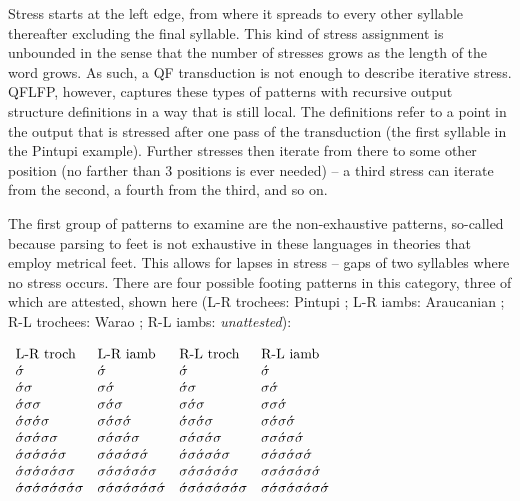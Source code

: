 \documentclass[12pt]{article}
\newcommand{\sig}{\sigma}
\newcommand{\ass}{\acute{\sig}}
\newcommand{\tm}{\textnormal}
\newcommand{\tr}{\ass\sig}
\newcommand{\im}{\sig\ass}
\begin{document}
\noindent 	
Stress starts at the left edge, from where it spreads to every other syllable thereafter excluding the final syllable. This kind of stress assignment is unbounded in the sense that the number of stresses grows as the length of the word grows. As such, a QF transduction is not enough to describe iterative stress. QFLFP, however, captures these types of patterns with recursive output structure definitions in a way that is still local. The definitions refer to a point in the output that is stressed after one pass of the transduction (the first syllable in the Pintupi example). Further stresses then iterate from there to some other position (no farther than 3 positions is ever needed) -- a third stress can iterate from the second, a fourth from the third, and so on.

The first group of patterns to examine are the non-exhaustive patterns, so-called because parsing to feet is not exhaustive in these languages in theories that employ metrical feet. This allows for lapses in stress -- gaps of two syllables where no stress occurs. There are four possible footing patterns in this category, three of which are attested, shown here (L-R trochees: Pintupi \citep{hansen69}; L-R iambs: Araucanian \citep{echev&cont65}; R-L trochees: Warao \citep{osborn66}; R-L iambs: \textit{unattested}):

 \begin{exe}
 \item	$\begin{array}[t]{llll}
  	\tm{L-R troch}   & \tm{L-R iamb}   &   \tm{R-L troch}  & \tm{R-L iamb}       \\
  	\ass             & \ass            &   \ass            & \ass                \\
  	\tr              & \im             &   \tr             & \im                 \\
  	\tr\sig          & \im\sig         &   \sig\tr         & \sig\im             \\
  	\tr\tr           & \im\im          &   \tr\tr          & \im\im              \\
  	\tr\tr\sig       & \im\im\sig      &   \sig\tr\tr      & \sig\im\im          \\
  	\tr\tr\tr        & \im\im\im       &   \tr\tr\tr       & \im\im\im           \\
  	\tr\tr\tr\sig    & \im\im\im\sig   &   \sig\tr\tr\tr   & \sig\im\im\im       \\
  	\tr\tr\tr\tr     & \im\im\im\im    &   \tr\tr\tr\tr    & \im\im\im\im
  	
 	\end{array}$
 	\label{iterativenonex}
\end{exe}
\end{document}
